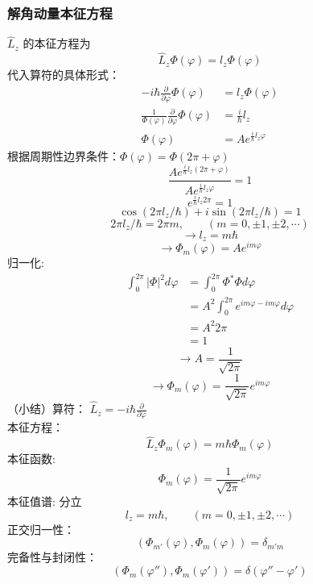 \begin{frame} [allowframebreaks=]
    \frametitle{解角动量本征方程}
    $\hat{L}_z$ 的本征方程为 $$\hat{L}_z\Phi(\varphi)=l_z\Phi(\varphi)$$
    代入算符的具体形式：
    \begin{equation*}
        \begin{split}
            -i \hbar \frac{\partial}{\partial \varphi}\Phi(\varphi)&=l_z\Phi(\varphi) \\
            \frac{1}{\Phi(\varphi)}\frac{\partial}{\partial \varphi}\Phi(\varphi)&=\frac{i}{\hbar}l_z \\
            \Phi(\varphi)&=A e ^{\frac{i}{\hbar}l_z\varphi}
        \end{split} 
    \end{equation*}
     根据周期性边界条件：$\Phi(\varphi)=\Phi(2\pi+\varphi)$\\
    \begin{equation*}
        \frac{A e ^{\frac{i}{\hbar}l_z(2\pi+\varphi)}}{A e ^{\frac{i}{\hbar}l_z\varphi}}=1
    \end{equation*} 
    \begin{equation*}
        e ^{\frac{i}{\hbar}l_z2\pi}=1
    \end{equation*} 
    $$
    \cos \left(2 \pi l_{z} / \hbar\right)+i \sin \left(2 \pi l_{z} / \hbar\right)=1
    $$
    $$ 2 \pi l_{z} / \hbar=2\pi m, \qquad (m=0,\pm 1,  \pm 2, \cdots) $$
    $$\to l_z=m\hbar$$
    $$\to \Phi_m(\varphi)=Ae^{im\varphi}$$
    归一化:
    \begin{equation*}
        \begin{split}
            \int_0 ^{2\pi} |\Phi|^2 d \varphi &= \int_0 ^{2\pi} \Phi^*\Phi  d \varphi \\
            &= A^2 \int_0 ^{2\pi} e^{im\varphi-im\varphi} d \varphi \\
            &= A^2 2\pi \\
            &= 1
        \end{split}   
    \end{equation*}
    $$ \to A= \frac{1}{\sqrt{2\pi}} $$
    $$ \to \Phi_m(\varphi)=\frac{1}{\sqrt{2\pi}}e^{im\varphi}$$
    （小结）算符：  $\hat{L}_{z}=-i \hbar \frac{\partial}{\partial \varphi}$ \\
    本征方程： $$\hat{L}_z\Phi_m(\varphi)=m\hbar \Phi_m (\varphi)$$
    本征函数: $$ \Phi_m(\varphi)=\frac{1}{\sqrt{2\pi}}e^{im\varphi}$$
    本征值谱:  分立
        $$ l_z=m\hbar, \qquad (m=0,\pm 1,  \pm 2, \cdots) $$
    正交归一性：
        $$ (\Phi_{m'}(\varphi), \Phi_m(\varphi)) =\delta_{m'm}$$
    完备性与封闭性：$$ (\Phi_m(\varphi''), \Phi_m(\varphi')) =\delta(\varphi''-\varphi')$$
\end{frame} 

